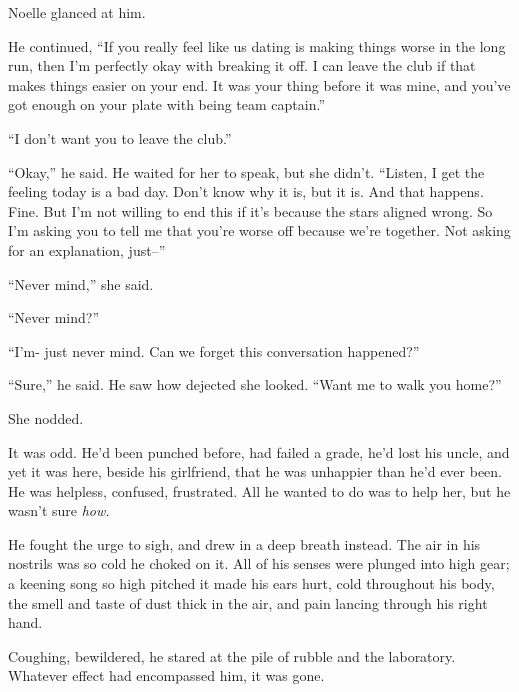 Noelle glanced at him.



He continued, ``If you really feel like us dating is making things worse in the long run, then I'm perfectly okay with breaking it off.  I can leave the club if that makes things easier on your end.  It was your thing before it was mine, and you've got enough on your plate with being team captain.''



``I don't want you to leave the club.''



``Okay,'' he said.  He waited for her to speak, but she didn't.  ``Listen, I get the feeling today is a bad day.  Don't know why it is, but it is.  And that happens.  Fine.  But I'm not willing to end this if it's because the stars aligned wrong.  So I'm asking you to tell me that you're worse off because we're together.  Not asking for an explanation, just--''



``Never mind,'' she said.



``Never mind?''



``I'm- just never mind.  Can we forget this conversation happened?''



``Sure,'' he said.  He saw how dejected she looked.  ``Want me to walk you home?''



She nodded.



It was odd.  He'd been punched before, had failed a grade, he'd lost his uncle, and yet it was here, beside his girlfriend, that he was unhappier than he'd ever been.  He was helpless, confused, frustrated.  All he wanted to do was to help her, but he wasn't sure \emph{how.}



He fought the urge to sigh, and drew in a deep breath instead.  The air in his nostrils was so cold he choked on it.  All of his senses were plunged into high gear; a keening song so high pitched it made his ears hurt, cold throughout his body, the smell and taste of dust thick in the air, and pain lancing through his right hand.



Coughing, bewildered, he stared at the pile of rubble and the laboratory.  Whatever effect had encompassed him, it was gone.



